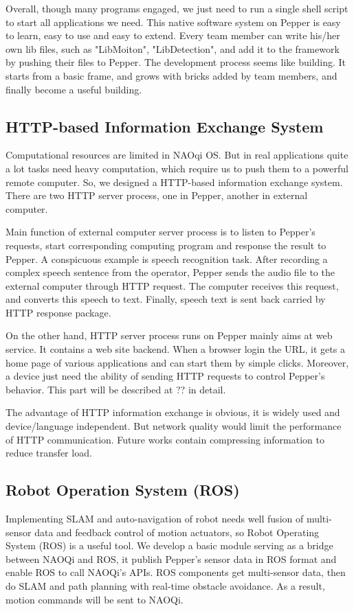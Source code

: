Overall, though many programs engaged, we just need to run a single shell script to start all applications we need. 
This native software system on Pepper is easy to learn, easy to use and easy to extend. 
Every team member can write his/her own lib files, such as "LibMoiton", "LibDetection", and add it to the framework by pushing their files to Pepper. 
The development process seems like building. It starts from a basic frame, and grows with bricks added by team members, and finally become a useful building.

\subsection{HTTP-based Information Exchange System}
\label{subsec:http}
Computational resources are limited in NAOqi OS. 
But in real applications quite a lot tasks need heavy computation, which require us to push them to a powerful remote computer.
So, we designed a HTTP-based information exchange system. There are two HTTP server process, one in Pepper, another in external computer. 

Main function of external computer server process is to listen to Pepper’s requests, start corresponding computing program and response the result to Pepper. 
A conspicuous example is speech recognition task. 
After recording a complex speech sentence from the operator, Pepper sends the audio file to the external computer through HTTP request. 
The computer receives this request, and converts this speech to text. 
Finally, speech text is sent back carried by HTTP response package. 

On the other hand, HTTP server process runs on Pepper mainly aims at web service. 
It contains a web site backend. 
When a browser login the URL, it gets a home page of various applications and can start them by simple clicks. 
Moreover, a device just need the ability of sending HTTP requests to control Pepper’s behavior. 
This part will be described at ?? in detail. 

The advantage of HTTP information exchange is obvious, it is widely used and device/language independent. 
But network quality would limit the performance of HTTP communication. 
Future works contain compressing information to reduce transfer load.

\subsection{Robot Operation System (ROS)}
\label{subsec:ros}

Implementing SLAM and auto-navigation of robot needs well fusion of multi-sensor data and feedback control of motion actuators, so Robot Operating System (ROS) is a useful tool. 
We develop a basic module serving as a bridge between NAOQi and ROS, it publish Pepper’s sensor data in ROS format and enable ROS to call NAOQi’s APIs. 
ROS components get multi-sensor data, then do SLAM and path planning with real-time obstacle avoidance. 
As a result, motion commands will be sent to NAOQi.